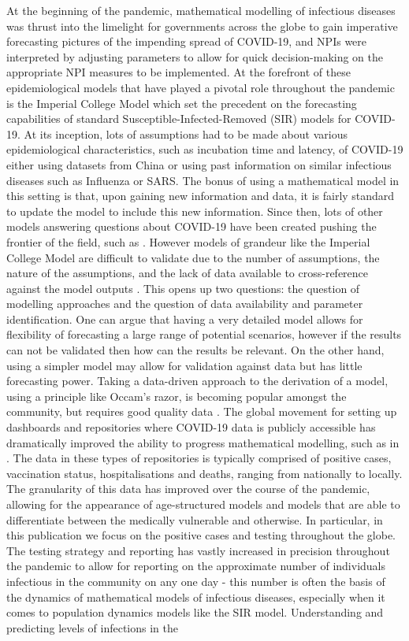 \documentclass{article}
\begin{document}
At the beginning of the pandemic, mathematical modelling of infectious diseases was thrust into the limelight for governments across the globe to gain imperative forecasting pictures of the impending spread of COVID-19, and NPIs were interpreted by adjusting parameters to allow for quick decision-making on the appropriate NPI measures to be implemented. At the forefront of these epidemiological models that have played a pivotal role throughout the pandemic is the Imperial College Model \cite{FLNal20} which set the precedent on the forecasting capabilities of standard Susceptible-Infected-Removed (SIR) models for COVID-19. At its inception, lots of assumptions had to be made about various epidemiological characteristics, such as incubation time and latency, of COVID-19 either using datasets from China or using past information on similar infectious diseases such as Influenza or SARS. The bonus of using a mathematical model in this setting is that, upon gaining new information and data, it is fairly standard to update the model to include this new information. Since then, lots of other models answering questions about COVID-19 have been created pushing the frontier of the field, such as \cite{CPKal21, KSMal21, OSAal20, HPNal21, MHG21}. However models of grandeur like the Imperial College Model are difficult to validate due to the number of assumptions, the nature of the assumptions, and the lack of data available to cross-reference against the model outputs \cite{CVAal21,BFMSS20,FWKal20,SBBal20,JLJ20}. This opens up two questions: the question of modelling approaches and the question of data availability and parameter identification. One can argue that having a very detailed model allows for flexibility of forecasting a large range of potential scenarios, however if the results can not be validated then how can the results be relevant. On the other hand, using a simpler model may allow for validation against data but has little forecasting power. Taking a data-driven approach to the derivation of a model, using a principle like Occam's razor, is becoming popular amongst the community, but requires good quality data \cite{OSAal20,CVAal21,BFMSS20,SBBal20,JLJ20,ABDWW06,A20}. The global movement for setting up dashboards and repositories where COVID-19 data is publicly accessible has dramatically improved the ability to progress mathematical modelling, such as in \cite{UKgov,JHdash}. The data in these types of repositories is typically comprised of positive cases, vaccination status, hospitalisations and deaths, ranging from nationally to locally. The granularity of this data has improved over the course of the pandemic, allowing for the appearance of age-structured models and models that are able to differentiate between the medically vulnerable and otherwise. In particular, in this publication we focus on the positive cases and testing throughout the globe. The testing strategy and reporting has vastly increased in precision throughout the pandemic to allow for reporting on the approximate number of individuals infectious in the community on any one day - this number is often the basis of the dynamics of mathematical models of infectious diseases, especially when it comes to population dynamics models like the SIR model. Understanding and predicting levels of infections in the 
\end{document}
